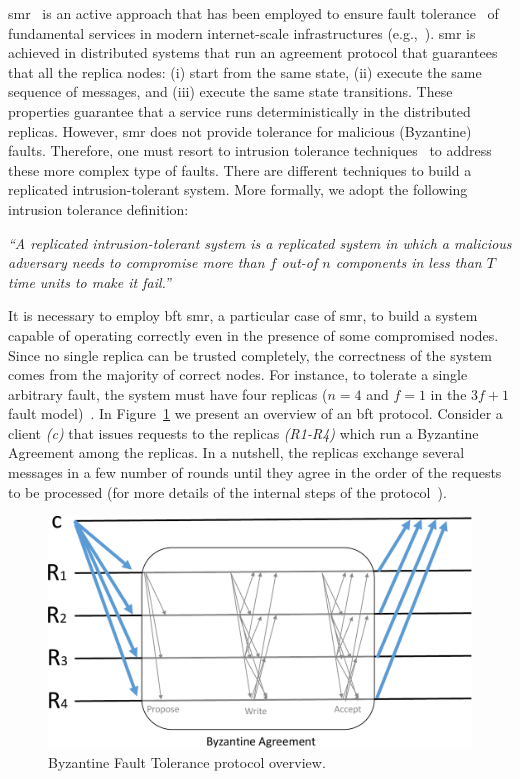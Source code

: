 \gls{smr}~\cite{Lamport:1984} is an active approach that has been employed to ensure fault tolerance~\cite{Schneider:1990} of fundamental services in modern internet-scale infrastructures (e.g.,~\cite{Hunt:2010,Calder:2011,Corbett:2013}).
\gls{smr} is achieved in distributed systems that run an agreement protocol that guarantees that all the replica nodes: (i) start from the same state, (ii) execute the same sequence of messages, and (iii) execute the same state transitions. 
These properties guarantee that a service runs deterministically in the distributed replicas.
However, \gls{smr} does not provide tolerance for malicious (Byzantine) faults.
Therefore, one must resort to intrusion tolerance techniques~\cite{Verissimo:2003} to address these more complex type of faults.
There are different techniques to build a replicated intrusion-tolerant system.
More formally, we adopt the following intrusion tolerance definition: 

\begin{defn}
\emph{``A replicated intrusion-tolerant system is a replicated system in which a malicious adversary needs to compromise more than $f$ out-of $n$ components in less than $T$ time units to make it fail.''}~\cite{Bessani:2011}
\label{def:def2}
\end{defn}

It is necessary to employ \gls{bft} \gls{smr}, a particular case of \gls{smr}, to build a system capable of operating correctly even in the presence of some compromised nodes.
Since no single replica can be trusted completely, the correctness of the system comes from the majority of correct nodes. 
For instance, to tolerate a single arbitrary fault, the system must have four replicas ($n = 4$ and $f = 1$ in the $3f + 1$ fault model)~\cite{Castro:1999}. 
In Figure~\ref{fig:bft} we present an overview of an \gls{bft} protocol. 
Consider a client \emph{(c)} that issues requests to the replicas \emph{(R1-R4)} which run a Byzantine Agreement among the replicas.
In a nutshell, the replicas exchange several messages in a few number of rounds until they agree in the order of the requests to be processed (for more details of the internal steps of the protocol~\cite{Castro:2002}).

\begin{figure}[h]
\begin{center}
\includegraphics[width=.5\columnwidth]{images/images/bft.pdf}
\caption{Byzantine Fault Tolerance protocol overview.}
\label{fig:bft}
\end{center}
\end{figure}


